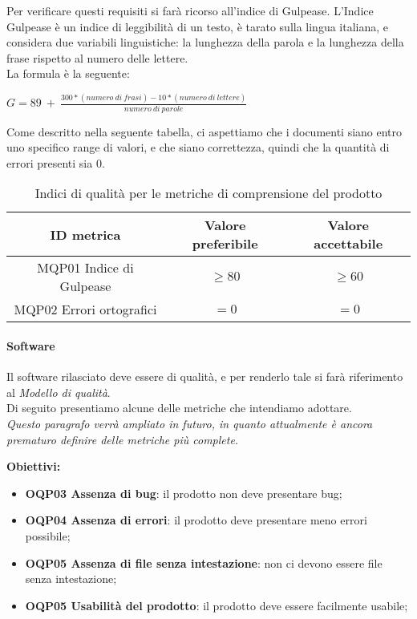\documentclass[../piano_di_qualifica.tex]{subfiles}
\begin{document}
Per verificare questi requisiti si farà ricorso all’indice di Gulpease. L'Indice Gulpease è un indice di leggibilità di un testo, è tarato sulla lingua italiana, e considera due variabili linguistiche: la lunghezza della parola e la lunghezza della frase rispetto al numero delle lettere.\\
La formula è la seguente:\par
\begin{center}
	$G = 89\ +\ \frac{300 * (numero\ di\ frasi) - 10 * (numero\ di\ lettere)}{numero\ di\ parole} $
\end{center}
Come descritto nella seguente tabella, ci aspettiamo che i documenti siano entro uno specifico range di valori, e che siano correttezza, quindi che la quantità di errori presenti sia 0. \par

\begin{table}[!ht]
\centering
\begin{tabular}{|c|c|c|}
		\hline
		\rowcolor{lightgray}
		\textbf{ID metrica} & \textbf{Valore preferibile} & \textbf{Valore accettabile} \\
		\hline 
		MQP01 Indice di Gulpease & \(\ge 80\) & \(\ge 60\) \\
 		\hline
		MQP02 Errori ortografici & \(= 0\) & \(= 0\) \\
		\hline
\end{tabular}
\caption{Indici di qualità per le metriche di comprensione del prodotto}
\end{table}

\paragraph{Software}
Il software rilasciato deve essere di qualità, e per renderlo tale si farà riferimento al \emph{Modello di qualità}. \\
Di seguito presentiamo alcune delle metriche che intendiamo adottare. \\
\emph{Questo paragrafo verrà ampliato in futuro, in quanto attualmente è ancora prematuro definire delle metriche più complete.}

\smallbreak
\textbf{Obiettivi:}
\smallbreak
\begin{itemize}
	\item \textbf{OQP03 Assenza di bug}: il prodotto non deve presentare bug;
	\item \textbf{OQP04 Assenza di errori}: il prodotto deve presentare meno errori possibile;
	\item \textbf{OQP05 Assenza di file senza intestazione}: non ci devono essere file senza intestazione;
	\item \textbf{OQP05 Usabilità del prodotto}: il prodotto deve essere facilmente usabile;
\end{itemize}
\end{document}
